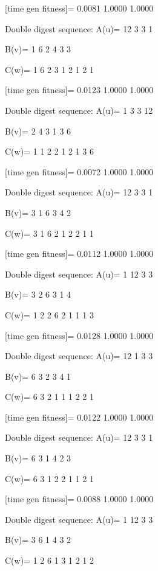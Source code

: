 [time gen fitness]=
    0.0081    1.0000    1.0000

Double digest sequence:
A(u)=
    12     3     3     1

B(v)=
     1     6     2     4     3     3

C(w)=
     1     6     2     3     1     2     1     2     1

[time gen fitness]=
    0.0123    1.0000    1.0000

Double digest sequence:
A(u)=
     1     3     3    12

B(v)=
     2     4     3     1     3     6

C(w)=
     1     1     2     2     1     2     1     3     6

[time gen fitness]=
    0.0072    1.0000    1.0000

Double digest sequence:
A(u)=
    12     3     3     1

B(v)=
     3     1     6     3     4     2

C(w)=
     3     1     6     2     1     2     2     1     1

[time gen fitness]=
    0.0112    1.0000    1.0000

Double digest sequence:
A(u)=
     1    12     3     3

B(v)=
     3     2     6     3     1     4

C(w)=
     1     2     2     6     2     1     1     1     3

[time gen fitness]=
    0.0128    1.0000    1.0000

Double digest sequence:
A(u)=
    12     1     3     3

B(v)=
     6     3     2     3     4     1

C(w)=
     6     3     2     1     1     1     2     2     1

[time gen fitness]=
    0.0122    1.0000    1.0000

Double digest sequence:
A(u)=
    12     3     3     1

B(v)=
     6     3     1     4     2     3

C(w)=
     6     3     1     2     2     1     1     2     1

[time gen fitness]=
    0.0088    1.0000    1.0000

Double digest sequence:
A(u)=
     1    12     3     3

B(v)=
     3     6     1     4     3     2

C(w)=
     1     2     6     1     3     1     2     1     2

